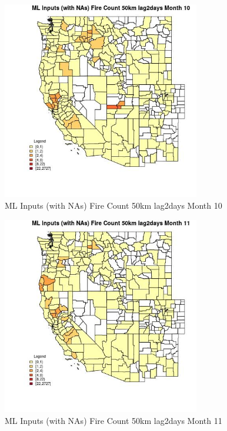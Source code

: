 \begin{figure} 
\centering  
\includegraphics[width=0.77\textwidth]{Code_Outputs/Report_ML_input_PM25_Step4_part_f_de_duplicated_aveswNAs_CountyFire_Count_50km_lag2daysmedianMonth10.jpg} 
\caption{\label{fig:Report_ML_input_PM25_Step4_part_f_de_duplicated_aveswNAsCountyFire_Count_50km_lag2daysmedianMonth10}ML Inputs (with NAs) Fire Count 50km lag2days Month 10} 
\end{figure} 
 

\begin{figure} 
\centering  
\includegraphics[width=0.77\textwidth]{Code_Outputs/Report_ML_input_PM25_Step4_part_f_de_duplicated_aveswNAs_CountyFire_Count_50km_lag2daysmedianMonth11.jpg} 
\caption{\label{fig:Report_ML_input_PM25_Step4_part_f_de_duplicated_aveswNAsCountyFire_Count_50km_lag2daysmedianMonth11}ML Inputs (with NAs) Fire Count 50km lag2days Month 11} 
\end{figure} 
 

